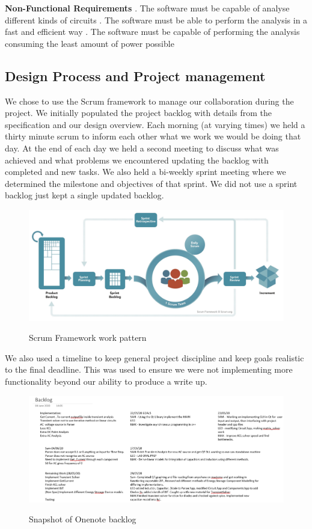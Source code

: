 \documentclass{article}
\begin{document}
\bigbreak

\textbf{Non-Functional Requirements}
. The software must be capable of analyse different kinds of circuits
. The software must be able to perform the analysis in a fast and efficient way
. The software must be capable of performing the analysis consuming the least amount of power possible

\newpage
\subsection{Design Process and Project management}

We chose to use the Scrum framework to manage our collaboration during the project. We initially populated the project backlog with details from the specification and our design overview. Each morning (at varying times) we held a thirty minute scrum to inform each other what we work we would be doing that day. At the end of each day we held a second meeting to discuss what was achieved and what problems we encountered updating the backlog with completed and new tasks.
We also held a bi-weekly sprint meeting where we determined the milestone and objectives of that sprint. We did not use a sprint backlog just kept a single updated backlog. 

\begin{figure}[h]
    \caption{Scrum Framework work pattern}
    \centering
    \includegraphics[width=\textwidth]{images/ScrumFramework.jpg}
    \label{fig:Scrum}
\end{figure}
We also used a timeline to keep general project discipline and keep goals realistic to the final deadline. This was used to ensure we were not implementing more functionality beyond our ability to produce a write up.
\begin{figure}[h]
    \caption{Snapshot of Onenote backlog}
    \centering
    \includegraphics[width=12cm]{images/Backlog.PNG}
    \label{fig:BackLog}
\end{figure}
\end{document}
